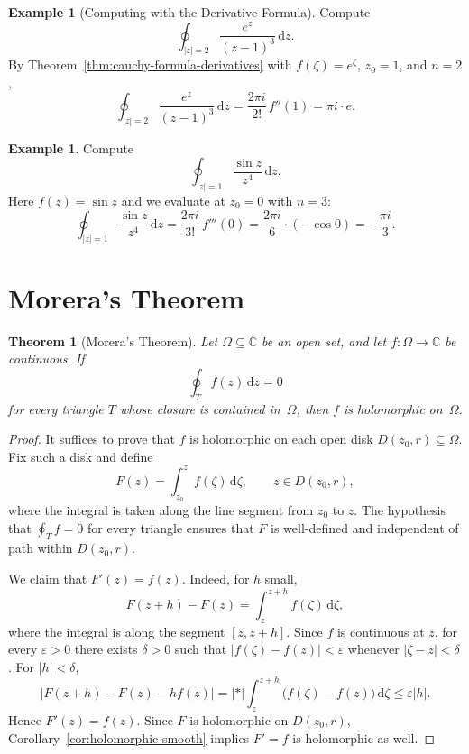 \documentclass[12pt,a4paper,openany]{book}
\theoremstyle{definition}
\newtheorem{example}[definition]{Example}
\theoremstyle{plain}
\newtheorem{theorem}[definition]{Theorem}
\theoremstyle{remark}
\newcommand{\C}{\mathbb{C}}
\newcommand{\dd}{\mathrm{d}}
\newcommand{\abs}[1]{\left|#1\right|}
\begin{document}
\begin{example}[Computing with the Derivative Formula]\label{ex:derivative-formula}
Compute
\[
  \oint_{\abs{z}=2}\frac{e^z}{(z-1)^3}\,\dd z.
\]
By Theorem~\ref{thm:cauchy-formula-derivatives} with $f(\zeta)=e^\zeta$, $z_0=1$,
and $n=2$,
\[
  \oint_{\abs{z}=2}\frac{e^z}{(z-1)^3}\,\dd z
  = \frac{2\pi i}{2!}\,f''(1) = \pi i\cdot e.
\]
\end{example}

\begin{example}\label{ex:derivative-formula2}
Compute
\[
  \oint_{\abs{z}=1}\frac{\sin z}{z^4}\,\dd z.
\]
Here $f(z)=\sin z$ and we evaluate at $z_0=0$ with $n=3$:
\[
  \oint_{\abs{z}=1}\frac{\sin z}{z^4}\,\dd z
  = \frac{2\pi i}{3!}\,f'''(0)
  = \frac{2\pi i}{6}\cdot(-\cos 0)
  = -\frac{\pi i}{3}.
\]
\end{example}

\section{Morera's Theorem}
\label{sec:morera}

\begin{theorem}[Morera's Theorem]\label{thm:morera}
Let $\Omega\subseteq\C$ be an open set, and let $f\colon\Omega\to\C$ be continuous.
If
\[
  \oint_T f(z)\,\dd z = 0
\]
for every triangle $T$ whose closure is contained in~$\Omega$, then $f$ is
holomorphic on~$\Omega$.
\end{theorem}

\begin{proof}
It suffices to prove that $f$ is holomorphic on each open disk $D(z_0,r)\subseteq\Omega$.
Fix such a disk and define
\[
  F(z) = \int_{z_0}^z f(\zeta)\,\dd\zeta, \qquad z\in D(z_0,r),
\]
where the integral is taken along the line segment from $z_0$ to $z$. The
hypothesis that $\oint_T f = 0$ for every triangle ensures that $F$ is
well-defined and independent of path within $D(z_0,r)$.

We claim that $F'(z)=f(z)$. Indeed, for $h$ small,
\[
  F(z+h)-F(z) = \int_z^{z+h}f(\zeta)\,\dd\zeta,
\]
where the integral is along the segment $[z,z+h]$. Since $f$ is continuous
at $z$, for every $\varepsilon>0$ there exists $\delta>0$ such that
$\abs{f(\zeta)-f(z)}<\varepsilon$ whenever $\abs{\zeta-z}<\delta$. For
$\abs{h}<\delta$,
\[
  \abs{F(z+h)-F(z)-hf(z)}
  = \abs*{\int_z^{z+h}\bigl(f(\zeta)-f(z)\bigr)\,\dd\zeta}
  \le \varepsilon\abs{h}.
\]
Hence $F'(z)=f(z)$. Since $F$ is holomorphic on $D(z_0,r)$,
Corollary~\ref{cor:holomorphic-smooth} implies $F' = f$ is holomorphic as well.
\end{proof}
\end{document}
